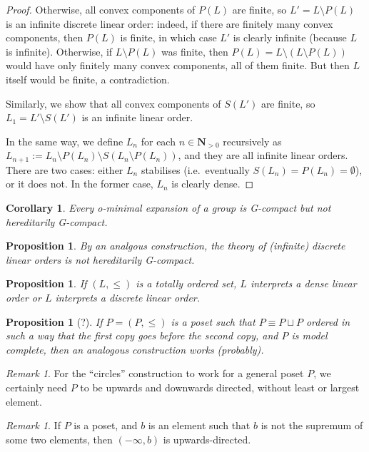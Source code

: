\documentclass[final,a4paper,12pt]{amsart}
\newcommand{\bN}{{\mathbf{N}}}
\newtheorem{cor}[thm]{Corollary}
\newtheorem{prop}[thm]{Proposition}
\theoremstyle{remark}
\newtheorem{rem}[thm]{Remark}
\theoremstyle{definition}
\begin{document}
\begin{proof}
		Otherwise, all convex components of $P(L)$ are finite, so $L'=L\setminus P(L)$ is an infinite discrete linear order: indeed, if there are finitely many convex components, then $P(L)$ is finite, in which case $L'$ is clearly infinite (because $L$ is infinite). Otherwise, if $L\setminus P(L)$ was finite, then $P(L)=L\setminus(L\setminus P(L))$ would have only finitely many convex components, all of them finite. But then $L$ itself would be finite, a contradiction.
		
		Similarly, we show that all convex components of $S(L')$ are finite, so $L_1=L'\setminus S(L')$ is an infinite linear order.
		
		In the same way, we define $L_n$ for each $n\in \bN_{>0}$ recursively as $L_{n+1}:=L_{n}\setminus P(L_n)\setminus S(L_n\setminus P(L_n))$, and they are all infinite linear orders. There are two cases: either $L_n$ stabilises (i.e.\ eventually $S(L_n)=P(L_n)=\emptyset$), or it does not. In the former case, $L_n$ is clearly dense.
	\end{proof}
	
	
	\begin{cor}
		Every o-minimal expansion of a group is G-compact but not hereditarily G-compact.
	\end{cor}
	
	\begin{prop}
		By an analgous construction, the theory of (infinite) discrete linear orders is not hereditarily G-compact.
	\end{prop}
	
	\begin{prop}
		If $(L,\leq)$ is a totally ordered set, $L$ interprets a dense linear order or $L$ interprets a discrete linear order.
	\end{prop}
	
	\begin{prop}[?]
		If $P=(P,\leq)$ is a poset such that $P\equiv P\sqcup P$ ordered in such a way that the first copy goes before the second copy, and $P$ is model complete, then an analogous construction works (probably).
	\end{prop}
	
	\begin{rem}
		For the ``circles'' construction to work for a general poset $P$, we certainly need $P$ to be upwards and downwards directed, without least or largest element.
	\end{rem}
	
	\begin{rem}
		If $P$ is a poset, and $b$ is an element such that $b$ is not the supremum of some two elements, then $(-\infty,b)$ is upwards-directed.
	\end{rem}
	
\end{document}
